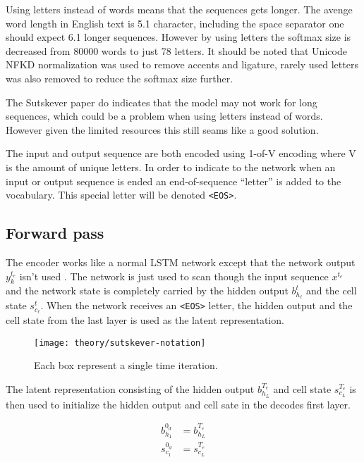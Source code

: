 Using letters instead of words means that the sequences gets longer. The avenge word length in English text is 5.1 character, including the space separator one should expect 6.1 longer sequences. However by using letters the softmax size is decreased from 80000 words to just 78 letters. It should be noted that Unicode NFKD normalization \cite{unicode-normalization} was used to remove accents and ligature, rarely used letters was also removed to reduce the softmax size further.

The Sutskever paper \cite{sutskever} do indicates that the model may not work for long sequences, which could be a problem when using letters instead of words. However given the limited resources this still seams like a good solution.

The input and output sequence are both encoded using 1-of-V encoding where V is the amount of unique letters. In order to indicate to the network when an input or output sequence is ended an end-of-sequence ``letter'' is added to the vocabulary. This special letter will be denoted \texttt{<EOS>}.


\subsection{Forward pass}

The encoder works like a normal LSTM network except that the network output $y_k^{t_e}$ isn't used . The network is just used to scan though the input sequence $x^{t_e}$ and the network state is completely carried by the hidden output $b_{h_\ell}^t$ and the cell state $s_{c_\ell}^t$. When the network receives an \texttt{<EOS>} letter, the hidden output and the cell state from the last layer is used as the latent representation.

\begin{figure}[H]
	\centering
	\texttt{[image: theory/sutskever-notation]}
	\caption{Each box represent a single time iteration.}
\end{figure}

The latent representation consisting of the hidden output $b_{h_{L}}^{T_e}$ and cell state $s_{c_{L}}^{T_e}$ is then used to initialize the hidden output and cell sate in the decodes first layer.

\begin{equation}
\begin{aligned}
b_{h_1}^{0_d} &= b_{h_{L}}^{T_e} \\
s_{c_1}^{0_d} &= s_{c_{L}}^{T_e}
\end{aligned}
\end{equation}

